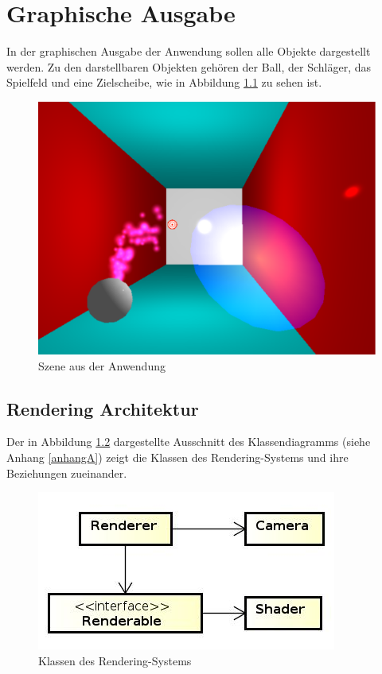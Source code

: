 
\chapter{Graphische Ausgabe}
\label{Kapitel 2}
%
In der graphischen Ausgabe der Anwendung sollen alle Objekte dargestellt werden. Zu den darstellbaren Objekten gehören der Ball, der Schläger, das Spielfeld und eine Zielscheibe, wie in Abbildung \ref{fig:gameScene} zu sehen ist.

\begin{figure}[h]
	\centering
	\includegraphics[width=0.6\linewidth]{bilder/gameScene}
	\caption{Szene aus der Anwendung}
	\label{fig:gameScene}
\end{figure}


\section{Rendering Architektur}
\label{Kapitel_2_-_Unterkapitel_1}
%
Der in Abbildung \ref{fig:renderingSystem} dargestellte Ausschnitt des Klassendiagramms (siehe Anhang \ref{anhangA}) zeigt die Klassen des Rendering-Systems und ihre Beziehungen zueinander.

\begin{figure}[h]
	\centering
	\includegraphics[width=0.6\linewidth]{bilder/RenderingSystem}
	\caption{Klassen des Rendering-Systems}
\label{fig:renderingSystem}
\end{figure}

